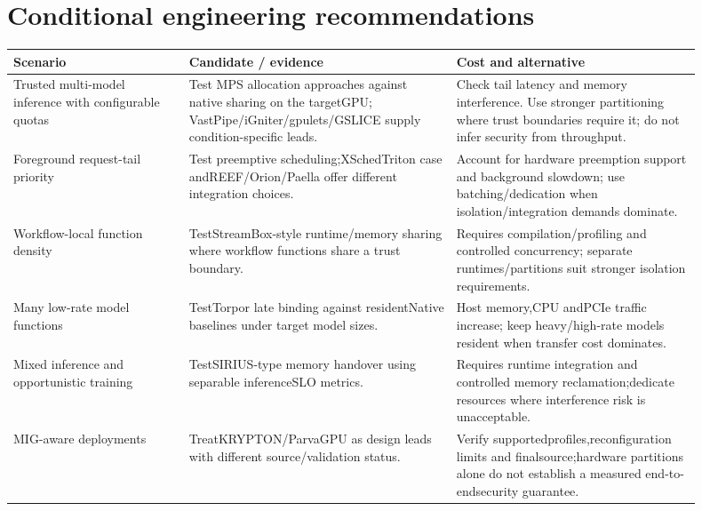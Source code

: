 \documentclass[12pt,a4paper]{article}
\begin{document}
\section{Conditional engineering recommendations}


{\small\begin{longtable}{>{\raggedright\arraybackslash}p{0.23\linewidth}>{\raggedright\arraybackslash}p{0.35\linewidth}>{\raggedright\arraybackslash}p{0.32\linewidth}}
\toprule
Scenario & Candidate /\allowbreak{} evidence & Cost and alternative\\\midrule
\endhead
Trusted multi-model inference with configurable quotas & Test MPS allocation approaches against native sharing on the targetGPU; VastPipe/\allowbreak{}iGniter/\allowbreak{}gpulets/\allowbreak{}GSLICE supply condition-specific leads. & Check tail latency and memory interference. Use stronger partitioning where trust boundaries require it; do not infer security from throughput.\\
Foreground request-tail priority & Test preemptive scheduling;XSchedTriton case andREEF/\allowbreak{}Orion/\allowbreak{}Paella offer different integration choices. & Account for hardware preemption support and background slowdown; use batching/\allowbreak{}dedication when isolation/\allowbreak{}integration demands dominate.\\
Workflow-local function density & TestStreamBox-style runtime/\allowbreak{}memory sharing where workflow functions share a trust boundary. & Requires compilation/\allowbreak{}profiling and controlled concurrency; separate runtimes/\allowbreak{}partitions suit stronger isolation requirements.\\
Many low-rate model functions & TestTorpor late binding against residentNative baselines under target model sizes. & Host memory,CPU andPCIe traffic increase; keep heavy/\allowbreak{}high-rate models resident when transfer cost dominates.\\
Mixed inference and opportunistic training & TestSIRIUS-type memory handover using separable inferenceSLO metrics. & Requires runtime integration and controlled memory reclamation;dedicate resources where interference risk is unacceptable.\\
MIG-aware deployments & TreatKRYPTON/\allowbreak{}ParvaGPU as design leads with different source/\allowbreak{}validation status. & Verify supportedprofiles,reconfiguration limits and finalsource;hardware partitions alone do not establish a measured end-to-endsecurity guarantee.\\
\bottomrule
\end{longtable}}
\end{document}
